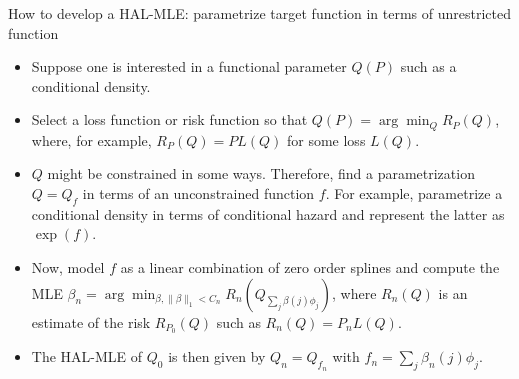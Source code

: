\documentclass[t]{beamer}
\begin{document}
\begin{frame}{How to develop a HAL-MLE: parametrize target function in terms of unrestricted function}
\begin{itemize}
\item Suppose one is interested in a functional parameter $Q(P)$  such as a conditional density.
\item Select a loss function or risk function so that $Q(P)=\arg\min_Q R_P(Q)$, where, for example, $R_P(Q)=PL(Q)$ for some loss $L(Q)$.
\item $Q$ might be constrained in some ways. Therefore, find a parametrization $Q=Q_f$ in terms of an unconstrained function $f$. For example, parametrize a conditional density in terms of conditional hazard and represent the latter as $\exp(f)$.
\item Now, model $f$ as a linear combination of zero order splines and compute the MLE
$\beta_n=\arg\min_{\beta,\lVert\beta\rVert_1<C_n}R_n\left (Q_{\sum_j \beta(j)\phi_j}\right)$,
where $R_n(Q)$ is an estimate of the risk $R_{P_0}(Q)$ such as $R_n(Q)=P_n L(Q)$.
\item The HAL-MLE of $Q_0$ is then given by $Q_n=Q_{f_n}$ with $f_n=\sum_j\beta_n(j)\phi_j$.
\end{itemize}
\end{frame}
\end{document}
